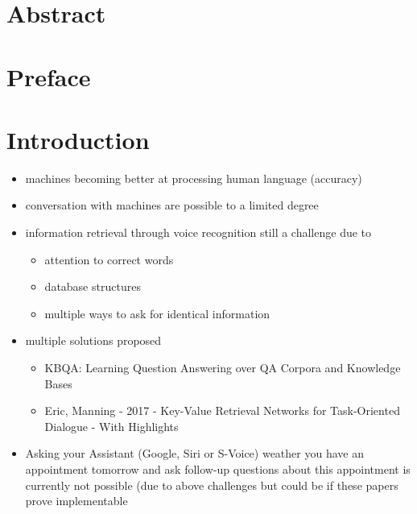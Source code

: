\documentclass[10pt,a4paper,titlepage,twoside,english, final]{zhawreprt}
\begin{document}
\maketitle

\chapter*{Abstract}\label{sec:Abstract}

\chapter*{Preface}\label{sec:Preface}
\makedeclarationoforiginality

\tableofcontents

\chapter{Introduction}\label{chp:Introduction}
\begin{itemize}
\item machines becoming better at processing human language (accuracy)
\item conversation with machines are possible to a limited degree
\item information retrieval through voice recognition still a challenge due to
\begin{itemize}
\item attention to correct words
\item database structures
\item multiple ways to ask for identical information
\end{itemize}
\item multiple solutions proposed
\begin{itemize}
\item KBQA: Learning Question Answering over QA Corpora and Knowledge Bases
\item Eric, Manning - 2017 - Key-Value Retrieval Networks for Task-Oriented Dialogue - With Highlights
\end{itemize}
\item Asking your Assistant (Google, Siri or S-Voice) weather you have an appointment tomorrow and ask follow-up questions about this appointment is currently not possible (due to above challenges but could be if these papers prove implementable
\end{itemize}
\end{document}
